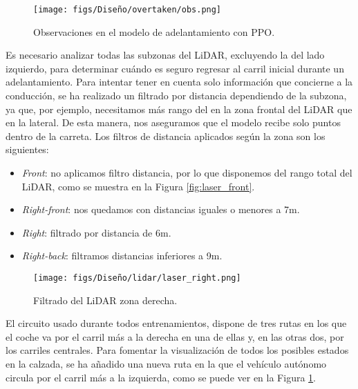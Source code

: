 \begin{figure}[ht]
  \centering
  \texttt{[image: figs/Diseño/overtaken/obs.png]}
  \caption{Observaciones en el modelo de adelantamiento con \ac{PPO}.}
  \label{fig:obs_overtaken}
\end{figure}

Es necesario analizar todas las subzonas del \ac{LiDAR}, excluyendo la del lado izquierdo, para determinar cuándo es seguro regresar al carril inicial durante un adelantamiento. Para intentar tener en cuenta solo información que concierne a la conducción, se ha realizado un filtrado por distancia dependiendo de la subzona, ya que, por ejemplo, necesitamos más rango del en la zona frontal del \ac{LiDAR} que en la lateral. De esta manera, nos aseguramos que el modelo recibe solo puntos dentro de la carreta. Los filtros de distancia aplicados según la zona son los siguientes:
\begin{itemize}
\item \textit{Front}: no aplicamos filtro distancia, por lo que disponemos del rango total del \ac{LiDAR}, como se muestra en la Figura \ref{fig:laser_front}.
\item \textit{Right-front}: nos quedamos con distancias iguales o menores a 7m.
\item \textit{Right}: filtrado por distancia de 6m.
\item \textit{Right-back}: filtramos distancias inferiores a 9m.
\end{itemize}

\begin{figure}[ht]
\centering
\texttt{[image: figs/Diseño/lidar/laser\_right.png]}
\caption{Filtrado del \ac{LiDAR} zona derecha.}
\label{fig:laser_right}
\end{figure}

El circuito usado durante todos entrenamientos, dispone de tres rutas en los que el coche va por el carril más a la derecha en una de ellas y, en las otras dos, por los carriles centrales. Para fomentar la visualización de todos los posibles estados en la calzada, se ha añadido una nueva ruta en la que el vehículo autónomo circula por el carril más a la izquierda, como se puede ver en la Figura \ref{fig:obs_overtaken}.

